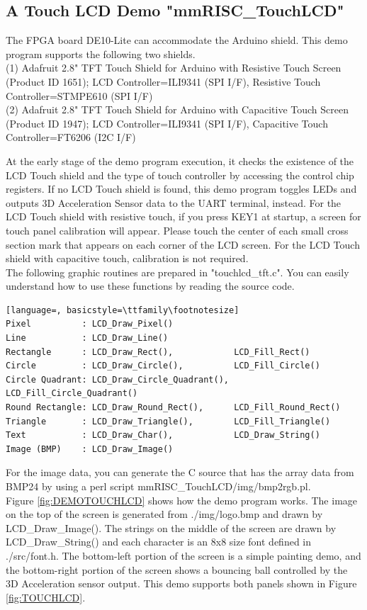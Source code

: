 \subsection{A Touch LCD Demo "mmRISC\_TouchLCD"}
The FPGA board DE10-Lite can accommodate the Arduino shield. This demo program supports the following two shields.\\
(1) Adafruit 2.8" TFT Touch Shield for Arduino with Resistive Touch Screen (Product ID 1651); LCD Controller=ILI9341 (SPI I/F), Resistive Touch Controller=STMPE610 (SPI I/F)\\
(2) Adafruit 2.8" TFT Touch Shield for Arduino with Capacitive Touch Screen (Product ID 1947); LCD Controller=ILI9341 (SPI I/F), Capacitive Touch Controller=FT6206 (I2C I/F)

At the early stage of the demo program execution, it checks the existence of the LCD Touch shield and the type of touch controller by accessing the control chip registers. If no LCD Touch shield is found, this demo program toggles LEDs and outputs 3D Acceleration Sensor data to the UART terminal, instead. For the LCD Touch shield with resistive touch, if you press KEY1 at startup, a screen for touch panel calibration will appear. Please touch the center of each small cross section mark that appears on each corner of the LCD screen. For the LCD Touch shield with capacitive touch, calibration is not required.\\
The following graphic routines are prepared in "touchlcd\_tft.c". You can easily understand how to use these functions by reading the source code.
\begin{lstlisting}[language=, basicstyle=\ttfamily\footnotesize]
Pixel          : LCD_Draw_Pixel()
Line           : LCD_Draw_Line()
Rectangle      : LCD_Draw_Rect(),            LCD_Fill_Rect()
Circle         : LCD_Draw_Circle(),          LCD_Fill_Circle()
Circle Quadrant: LCD_Draw_Circle_Quadrant(), LCD_Fill_Circle_Quadrant()
Round Rectangle: LCD_Draw_Round_Rect(),      LCD_Fill_Round_Rect()
Triangle       : LCD_Draw_Triangle(),        LCD_Fill_Triangle()
Text           : LCD_Draw_Char(),            LCD_Draw_String()
Image (BMP)    : LCD_Draw_Image()
\end{lstlisting}

For the image data, you can generate the C source that has the array data from BMP24 by using a perl script mmRISC\_TouchLCD/img/bmp2rgb.pl.\\
Figure \ref{fig:DEMOTOUCHLCD} shows how the demo program works. The image on the top of the screen is generated from ./img/logo.bmp and drawn by LCD\_Draw\_Image(). The strings on the middle of the screen are drawn by LCD\_Draw\_String() and each character is an 8x8 size font defined in ./src/font.h. The bottom-left portion of the screen is a simple painting demo, and the bottom-right portion of the screen shows a bouncing ball controlled by the 3D Acceleration sensor output. This demo supports both panels shown in Figure \ref{fig:TOUCHLCD}.

